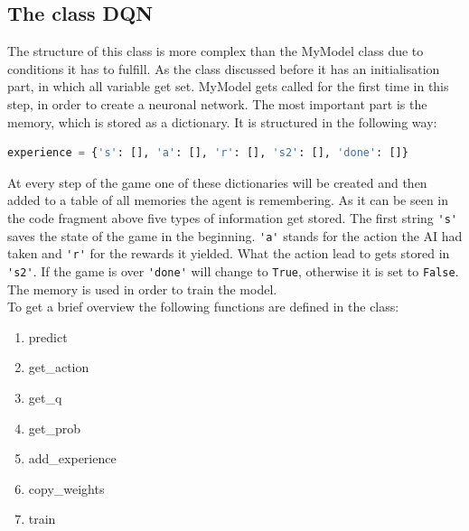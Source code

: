 \documentclass[12pt]{article}
\begin{document}
\subsection{The class DQN}
The structure of this class is more complex than the MyModel class due to conditions it has to fulfill. As the class discussed before it has an initialisation part, in which all variable get set. MyModel gets called for the first time in this step, in order to create a neuronal network. The most important part is the memory, which is stored as a dictionary. It is structured in the following way:
\begin{lstlisting}[language=Python, caption = Example - The memory of the neuronal network]
experience = {'s': [], 'a': [], 'r': [], 's2': [], 'done': []}
\end{lstlisting}
At every step of the game one of these dictionaries will be created and then added to a table of all memories the agent is remembering.
As it can be seen in the code fragment above five types of information get stored. The first string \lstinline{'s'} saves the state of the game in the beginning. \lstinline{'a'} stands for the action the AI had taken and \lstinline{'r'} for the rewards it yielded. What the action lead to gets stored in \lstinline{'s2'}. If the game is over \lstinline{'done'} will change to \lstinline{True}, otherwise it is set to \lstinline{False}. The memory is used in order to train the model. \\ To get a brief overview the following functions are defined in the class:
\begin{enumerate}
    \item predict
    \item get\_action
    \item get\_q
    \item get\_prob
    \item add\_experience
    \item copy\_weights
    \item train
\end{enumerate}
\end{document}
